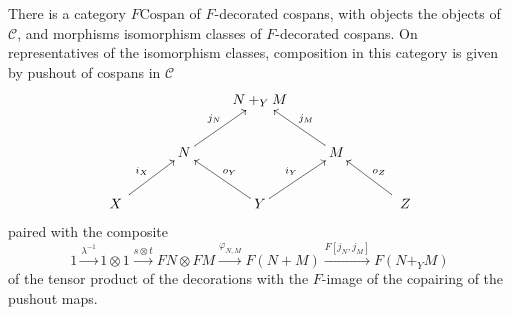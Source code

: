 \begin{proposition}
  There is a category $F\mathrm{Cospan}$ of $F$-decorated cospans, with objects
  the objects of $\mathcal C$, and morphisms isomorphism classes of
  $F$-decorated cospans. On representatives of the isomorphism classes,
  composition in this category is given by pushout of cospans in $\mathcal C$
  \[
    \xymatrix{
      && N+_YM \\
      & N \ar[ur]^{j_N} && M \ar[ul]_{j_M} \\
      \quad X \quad \ar[ur]^{i_X} && Y \ar[ul]_{o_Y} \ar[ur]^{i_Y} && \quad Z
      \quad \ar[ul]_{o_Z}
    }
  \]
  paired with the composite
  \[
    1 \stackrel{\lambda^{-1}}\longrightarrow 1 \otimes 1 \stackrel{s \otimes
    t}\longrightarrow FN \otimes FM \stackrel{\varphi_{N,M}}\longrightarrow
    F(N+M) \stackrel{F[j_N,j_M]}\longrightarrow F(N+_YM)
  \]
  of the tensor product of the decorations with the $F$-image of the copairing
  of the pushout maps.
\end{proposition}

